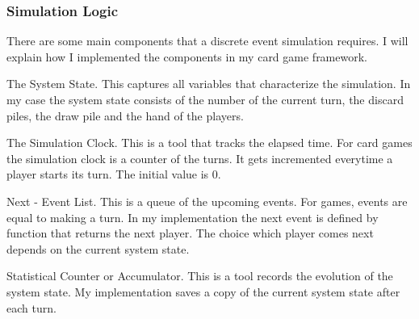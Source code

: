 \subsubsection{Simulation Logic}

There are some main components that a discrete event simulation requires. I will explain how I implemented the components in my card game framework. 


The System State. This captures all variables that characterize the simulation. In my case the system state consists of the number of the current turn, the discard piles, the draw pile and the hand of the players.

The Simulation Clock. This is a tool that tracks the elapsed time. For card games the simulation clock is a counter of the turns. It gets incremented everytime a player starts its turn. The initial value is 0.


Next - Event List. This is a queue of the upcoming events. For games, events are equal to making a turn. In my implementation the next event is defined by function that returns the next player. The choice which player comes next depends on the current system state.

Statistical Counter or Accumulator. This is a tool records the evolution of the system state. My implementation saves a copy of the current system state after each turn.

%
%
%
%


